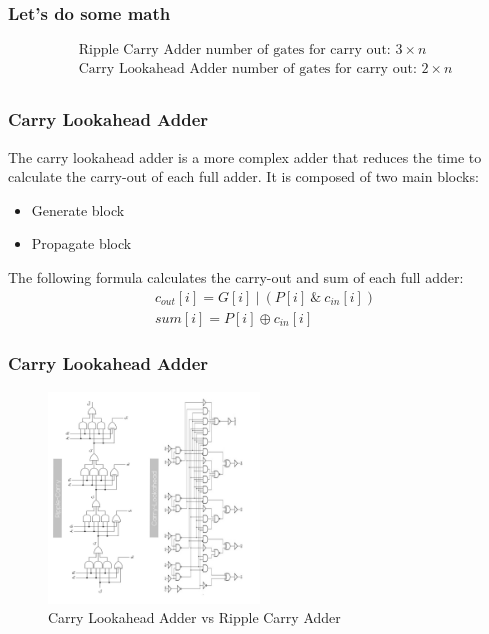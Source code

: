 \begin{frame}
    \frametitle{Let's do some math}
    \begin{equation}
        \begin{aligned}
            & \text{Ripple Carry Adder number of gates for carry out: } 3 \times n\\
            & \text{Carry Lookahead Adder number of gates for carry out: } 2 \times n\\
        \end{aligned}
    \end{equation}
\end{frame}


\begin{frame}
    \frametitle{Carry Lookahead Adder}
 The carry lookahead adder is a more complex adder that reduces the time to calculate the carry-out of each full adder.
 It is composed of two main blocks:
    \begin{itemize}
        \item Generate block
        \item Propagate block
    \end{itemize}
 The following formula calculates the carry-out and sum of each full adder:
    \begin{equation}
        \begin{aligned}
            &c_{out}[i]=G[i] \ | \ (P[i] \ \& \ c_{in}[i])\\
            &sum[i]=P[i] \oplus c_{in}[i]
        \end{aligned}
    \end{equation}

\end{frame}

\begin{frame}
    \frametitle{Carry Lookahead Adder}
    \begin{figure}
        \centering
        \includegraphics[width=0.5\textwidth, angle=270 ]{media/adders_comparison.jpg}
        \caption{Carry Lookahead Adder vs Ripple Carry Adder}
    \end{figure}
\end{frame}

